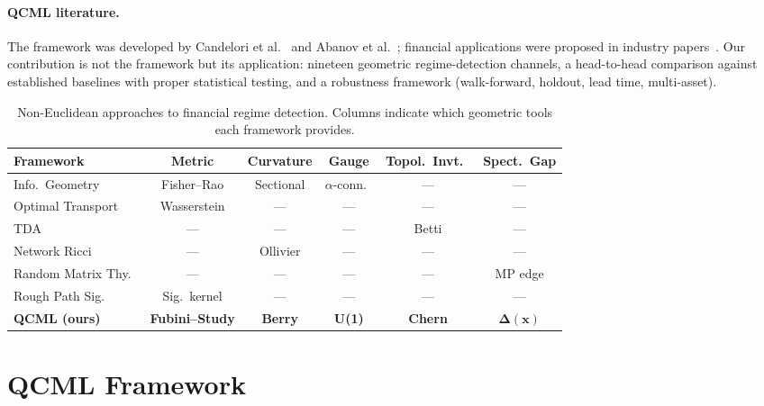 \documentclass[3p]{elsarticle}
\begin{document}
\paragraph{QCML literature.}
The framework was developed by Candelori et
al.~\cite{candelori2025} and Abanov et al.~\cite{abanov2025};
financial applications were proposed in industry
papers~\cite{musaelian2024,samson2024}.  Our contribution is
not the framework but its application: nineteen geometric
regime-detection channels, a head-to-head comparison against
established baselines with proper statistical testing, and a
robustness framework (walk-forward, holdout, lead time, multi-asset).

\begin{table}[htb]
\centering
\caption{Non-Euclidean approaches to financial regime detection.
Columns indicate which geometric tools each framework provides.}
\label{tab:geometry_compare}
\small
\begin{tabular}{lccccc}
\toprule
Framework & Metric & Curvature & Gauge & Topol.\ Invt.\ & Spect.\ Gap \\
\midrule
Info.\ Geometry       & Fisher--Rao  & Sectional & $\alpha$-conn.\ & --- & --- \\
Optimal Transport     & Wasserstein  & ---       & ---            & --- & --- \\
TDA                   & ---          & ---       & ---            & Betti & --- \\
Network Ricci         & ---          & Ollivier  & ---            & --- & --- \\
Random Matrix Thy.\   & ---          & ---       & ---            & --- & MP edge \\
Rough Path Sig.\      & Sig.\ kernel & ---       & ---            & --- & --- \\
\midrule
\textbf{QCML (ours)}  & \textbf{Fubini--Study} & \textbf{Berry} & \textbf{U(1)} & \textbf{Chern} & $\bm{\Delta(x)}$ \\
\bottomrule
\end{tabular}
\end{table}

\section{QCML Framework}\label{sec:framework}
\end{document}
